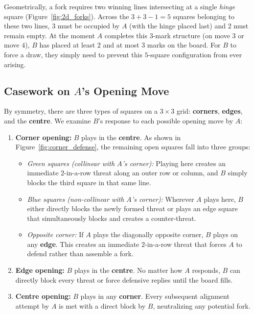 \documentclass[11pt, a4paper]{article}
\begin{document}
Geometrically, a fork requires two winning lines intersecting at a single \emph{hinge} square (Figure~\ref{fig:2d_forks}). Across the $3 + 3 - 1 = 5$ squares belonging to these two lines, $3$ must be occupied by $A$ (with the hinge placed last) and $2$ must remain empty. At the moment $A$ completes this $3$-mark structure (on move $3$ or move $4$), $B$ has placed at least $2$ and at most $3$ marks on the board. For $B$ to force a draw, they simply need to prevent this $5$-square configuration from ever arising.

\subsection{Casework on $A$'s Opening Move}
By symmetry, there are three types of squares on a $3 \times 3$ grid: \textbf{corners}, \textbf{edges}, and the \textbf{centre}. We examine $B$'s response to each possible opening move by $A$:

\begin{enumerate}
    \item \textbf{Corner opening:} $B$ plays in the \textbf{centre}. As shown in Figure~\ref{fig:corner_defense}, the remaining open squares fall into three groups:
    \begin{itemize}
        \item \emph{Green squares (collinear with $A$'s corner):} Playing here creates an immediate $2$-in-a-row threat along an outer row or column, and $B$ simply blocks the third square in that same line.
        \item \emph{Blue squares (non-collinear with $A$'s corner):} Wherever $A$ plays here, $B$ either directly blocks the newly formed threat or plays an edge square that simultaneously blocks and creates a counter-threat.
        \item \emph{Opposite corner:} If $A$ plays the diagonally opposite corner, $B$ plays on any \textbf{edge}. This creates an immediate $2$-in-a-row threat that forces $A$ to defend rather than assemble a fork.
    \end{itemize}
    \item \textbf{Edge opening:} $B$ plays in the \textbf{centre}. No matter how $A$ responds, $B$ can directly block every threat or force defensive replies until the board fills.
    \item \textbf{Centre opening:} $B$ plays in any \textbf{corner}. Every subsequent alignment attempt by $A$ is met with a direct block by $B$, neutralizing any potential fork.
\end{enumerate}
\end{document}
